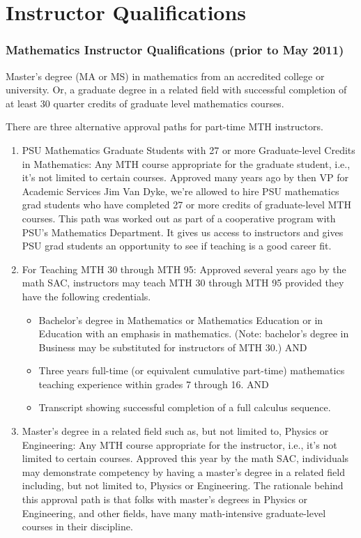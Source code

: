 \chapter{Instructor Qualifications}\label{app:sec:instructorquals}
\subsection{Mathematics Instructor Qualifications (prior to May 2011)}
Master's degree (MA or MS) in mathematics from an accredited college or university.  Or, a graduate degree in a related field with successful completion of at least 30 quarter credits of graduate level mathematics courses.

There are three alternative approval paths for part-time MTH instructors.
\begin{enumerate}
  \item PSU Mathematics Graduate Students with 27 or more Graduate-level Credits in Mathematics: Any MTH course appropriate for the graduate student, i.e., it's not limited to certain courses. Approved many years ago by then VP for Academic Services Jim Van Dyke, we're allowed to hire PSU mathematics grad students who have completed 27 or more credits of graduate-level MTH courses. This path was worked out as part of a cooperative program with PSU's Mathematics Department. It gives us access to instructors and gives PSU grad students an opportunity to see if teaching is a good career fit.
  \item For Teaching MTH 30 through MTH 95: Approved several years ago by the math SAC, instructors may teach MTH 30 through MTH 95 provided they have the following credentials.
    \begin{itemize}
      \item Bachelor's degree in Mathematics or Mathematics Education or in Education with an emphasis in mathematics. (Note: bachelor's degree in Business may be substituted for instructors of MTH 30.)
        AND
      \item Three years full-time (or equivalent cumulative part-time) mathematics teaching experience within grades 7 through 16.
        AND
      \item Transcript showing successful completion of a full calculus sequence.
    \end{itemize}
  \item Master's degree in a related field such as, but not limited to, Physics or Engineering: Any MTH course appropriate for the instructor, i.e., it's not limited to certain courses. Approved this year by the math SAC, individuals may demonstrate competency by having a master's degree in a related field including, but not limited to, Physics or Engineering. The rationale behind this approval path is that folks with master's degrees in Physics or Engineering, and other fields, have many math-intensive graduate-level courses in their discipline.
\end{enumerate}

